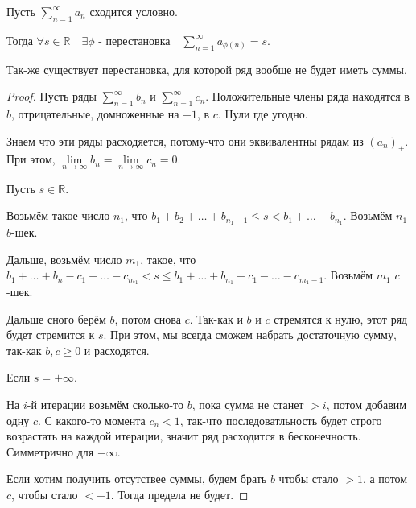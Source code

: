 \begin{theorem} \thmslashn

    Пусть $\sum\limits_{n=1}^{\infty} a_{n}$ сходится условно.

    Тогда $\forall{s\in \overline{\mathbb{R}}}\quad \exists{\phi \text{ - перестановка}}\quad  \sum\limits_{n=1}^{\infty} a_{\phi(n)} = s$.

    Так-же существует перестановка, для которой ряд вообще не будет иметь суммы.
    \begin{proof} \thmslashn
    
        Пусть ряды $\sum\limits_{n=1}^{\infty} b_{n}$ и $\sum\limits_{n=1}^{\infty} c_{n}$. Положительные члены ряда находятся в $b$, отрицательные, домноженные на  $-1$, в  $c$. Нули где угодно.

        Знаем что эти ряды расходяется, потому-что они эквивалентны рядам из $(a_{n})_{\pm}$. При этом, $\lim\limits_{n \to \infty} b_{n} = \lim\limits_{n \to \infty} c_{n} = 0$.

        Пусть $s\in \mathbb{R}$.

        Возьмём такое число $n_1$, что  $b_1 + b_2 + \ldots + b_{n_1-1} \le s < b_1 + \ldots + b_{n_1}$. Возьмём $n_1$  $b$-шек.

        Дальше, возьмём число $m_1$, такое, что $b_1 + \ldots + b_{n} - c_1 - \ldots - c_{m_1} < s \le  b_1 + \ldots + b_{n_1} - c_1 - \ldots - c_{m_1-1}$. Возьмём $m_1$ $c$-шек.

        Дальше сного берём $b$, потом снова $c$. Так-как и $b$ и $c$ стремятся к нулю, этот ряд будет стремится к $s$. При этом, мы всегда сможем набрать достаточную сумму, так-как $b, c \ge 0$ и расходятся.

        Если $s = +\infty$.

        На $i$-й итерации возьмём сколько-то $b$, пока сумма не станет $> i$, потом добавим одну $c$. С какого-то момента $c_{n} < 1$, так-что последоватльность будет строго возрастать на каждой итерации, значит ряд расходится в бесконечность. Симметрично для $-\infty$.

        Если хотим получить отсутствее суммы, будем брать $b$ чтобы стало $>1$, а потом $c$, чтобы стало $< -1$. Тогда предела не будет.
    \end{proof}
\end{theorem}
